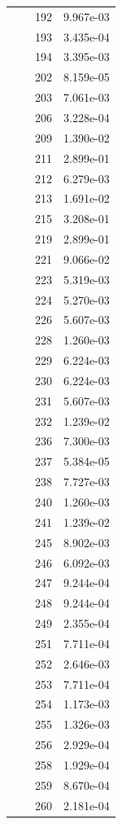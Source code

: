 \documentclass[12pt]{article}
\begin{document}
\begin{longtable}{@{}cccc@{}}
 &  & 192 & 9.967e-03 \\
 &  & 193 & 3.435e-04 \\
 &  & 194 & 3.395e-03 \\
 &  & 202 & 8.159e-05 \\
 &  & 203 & 7.061e-03 \\
 &  & 206 & 3.228e-04 \\
 &  & 209 & 1.390e-02 \\
 &  & 211 & 2.899e-01 \\
 &  & 212 & 6.279e-03 \\
 &  & 213 & 1.691e-02 \\
 &  & 215 & 3.208e-01 \\
 &  & 219 & 2.899e-01 \\
 &  & 221 & 9.066e-02 \\
 &  & 223 & 5.319e-03 \\
 &  & 224 & 5.270e-03 \\
 &  & 226 & 5.607e-03 \\
 &  & 228 & 1.260e-03 \\
 &  & 229 & 6.224e-03 \\
 &  & 230 & 6.224e-03 \\
 &  & 231 & 5.607e-03 \\
 &  & 232 & 1.239e-02 \\
 &  & 236 & 7.300e-03 \\
 &  & 237 & 5.384e-05 \\
 &  & 238 & 7.727e-03 \\
 &  & 240 & 1.260e-03 \\
 &  & 241 & 1.239e-02 \\
 &  & 245 & 8.902e-03 \\
 &  & 246 & 6.092e-03 \\
 &  & 247 & 9.244e-04 \\
 &  & 248 & 9.244e-04 \\
 &  & 249 & 2.355e-04 \\
 &  & 251 & 7.711e-04 \\
 &  & 252 & 2.646e-03 \\
 &  & 253 & 7.711e-04 \\
 &  & 254 & 1.173e-03 \\
 &  & 255 & 1.326e-03 \\
 &  & 256 & 2.929e-04 \\
 &  & 258 & 1.929e-04 \\
 &  & 259 & 8.670e-04 \\
 &  & 260 & 2.181e-04 \\

\end{longtable}
\end{document}
